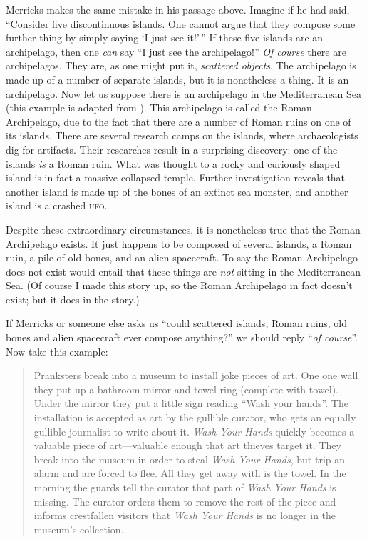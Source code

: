 \documentclass[11pt]{article}
\begin{document}
\begin{spacing}{1.25}
Merricks makes the same mistake in his passage above.  Imagine if he
had said, ``Consider five discontinuous islands.  One cannot argue
that they compose some further thing by simply saying `I just see
it!'\,'' If these five islands are an archipelago, then one {\em can}
say ``I just see the archipelago!''  {\em Of course} there are
archipelagos.  They are, as one might put it, {\em scattered objects}.
The archipelago is made up of a number of separate islands, but it is
nonetheless a thing.  It is an archipelago.  Now let us suppose there
is an archipelago in the Mediterranean Sea (this example is adapted
from \citet{hawthorne2008}).  This archipelago is called the Roman
Archipelago, due to the fact that there are a number of Roman ruins on
one of its islands.  There are several research camps on the islands,
where archaeologists dig for artifacts.  Their researches result in a
surprising discovery: one of the islands {\em is} a Roman ruin.  What
was thought to a rocky and curiously shaped island is in fact a
massive collapsed temple.  Further investigation reveals that another
island is made up of the bones of an extinct sea monster, and another
island is a crashed \textsc{ufo}.

Despite these extraordinary circumstances, it is nonetheless true that
the Roman Archipelago exists.  It just happens to be composed of
several islands, a Roman ruin, a pile of old bones, and an alien
spacecraft.  To say the Roman Archipelago does not exist would entail
that these things are {\em not} sitting in the Mediterranean Sea.  (Of
course I made this story up, so the Roman Archipelago in fact doesn't
exist; but it does in the story.)

If Merricks or someone else asks us ``could scattered islands, Roman
ruins, old bones and alien spacecraft ever compose anything?'' we
should reply ``{\em of course}''.  Now take this example:

\begin{quote}
Pranksters break into a museum to install joke pieces of art.  One one
wall they put up a bathroom mirror and towel ring (complete with
towel).  Under the mirror they put a little sign reading ``Wash your
hands''.  The installation is accepted as art by the gullible curator,
who gets an equally gullible journalist to write about it.  {\em Wash
  Your Hands} quickly becomes a valuable piece of art---valuable
enough that art thieves target it.  They break into the museum in
order to steal {\em Wash Your Hands}, but trip an alarm and are forced
to flee.  All they get away with is the towel.  In the morning the
guards tell the curator that part of {\em Wash Your Hands} is missing.
The curator orders them to remove the rest of the piece and informs
crestfallen visitors that {\em Wash Your Hands} is no longer in the
museum's collection.
\end{quote}


\end{spacing}
\end{document}
